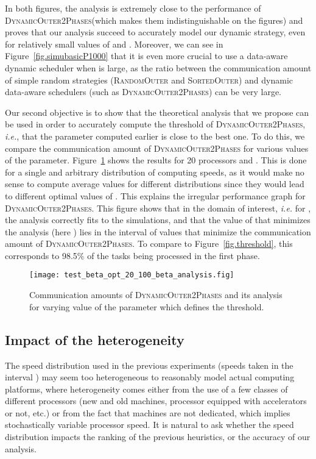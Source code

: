 \documentclass[a4paper,10pt]{article}
\newcommand{\ie}{{\it i.e.}\xspace}
\newcommand{\simplerandom}{\textsc{Random\-Outer}\xspace}
\newcommand{\simplesorted}{\textsc{Sorted\-Outer}\xspace}
\newcommand{\stupidthreshold}{\textsc{Dynamic\-Outer\-2Phases}\xspace}
\begin{document}
In both figures, the analysis is extremely close to the performance of
\stupidthreshold (which makes them indistinguishable on the figures)
and proves that our analysis succeed to accurately model our dynamic
strategy, even for relatively small values of  and . Moreover, we can see in Figure~\ref{fig.simubasicP1000} that it
is even more crucial to use a data-aware dynamic scheduler when  is
large, as the ratio between the communication amount of simple random
strategies (\simplerandom and \simplesorted) and dynamic data-aware
schedulers (such as \stupidthreshold) can be very large.



Our second objective is to show that the theoretical analysis that we propose can be used in order to accurately
compute the threshold of \stupidthreshold, \ie, that the 
parameter computed earlier is close to the best one. To do this, we
compare the communication amount of \stupidthreshold for various
values of the  parameter. Figure~\ref{fig.beta} shows the
results for 20 processors and . This is done for a single and
arbitrary distribution of computing speeds, as it would make no sense
to compute average values for different distributions since they would lead to
different optimal values of . This explains the irregular
performance graph for \stupidthreshold.  This figure shows that in the
domain of interest, \ie for , the analysis
correctly fits to the simulations, and that the value of  that
minimizes the analysis (here ) lies in the interval of
 values that minimize the communication amount of
\stupidthreshold. To compare to Figure~\ref{fig.threshold}, this
corresponds to 98.5\% of the tasks being processed in the first phase.


\begin{figure}[htbp]
  \centering
  \texttt{[image: test\_beta\_opt\_20\_100\_beta\_analysis.fig]}
  \caption{Communication amounts of \stupidthreshold and its analysis
    for varying value of the  parameter which defines the
    threshold.}
  \label{fig.beta}
\end{figure}

\subsection{Impact of the heterogeneity}
\label{hetero-models}

The speed distribution used in the previous experiments (speeds taken
in the interval ) may seem too heterogeneous to  reasonably
model actual computing platforms, where heterogeneity comes either
from the use of a few classes of different processors (new and old
machines, processor equipped with accelerators or not, etc.) or from
the fact that machines are not dedicated, which implies stochastically
variable processor speed. It is natural to ask whether the speed
distribution impacts the ranking of the previous heuristics, or the
accuracy of our analysis.
\end{document}
